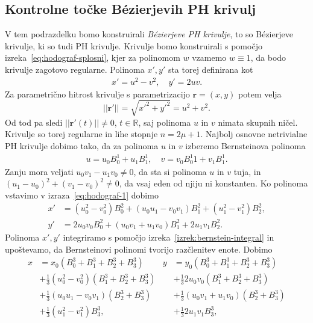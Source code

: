 \documentclass[isrm2, tisk]{fmfdelo}
\newcommand{\R}{\mathbb R}
\begin{document}
    \subsection{Kontrolne točke Bézierjevih PH krivulj}
    V tem podrazdelku bomo konstruirali \textit{Bézierjeve PH krivulje}, to so Bézierjeve krivulje, ki so tudi PH krivulje.
    Krivulje bomo konstruirali s pomočjo izreka~\eqref{eq:hodograf-splosni}, kjer za polinomom $w$ vzamemo $w\equiv 1$, da bodo krivulje zagotovo regularne.
    Polinoma $x',y'$ sta torej definirana kot
    \begin{align}
        x'=u^2-v^2,\quad y'=2uv.  \label{eq:hodograf-1}
    \end{align}
    Za parametrično hitrost krivulje s parametrizacijo $\mathbf{r}=(x,y)$ potem velja
    \[||\mathbf{r'}|| =\sqrt{ x'^2 + y'^2} = u^2+v^2.\]
    Od tod pa sledi $||\mathbf{r'}(t)||\neq 0$, $t\in \R$, saj polinoma $u$ in $v$ nimata skupnih ničel.
    Krivulje so torej regularne in lihe stopnje $n=2\mu+1$.
    Najbolj osnovne netrivialne PH krivulje dobimo tako, da za polinoma $u$ in $v$ izberemo Bernsteinova polinoma
    \begin{align}
        \label{eq:ph-bernstein-1}
        u=u_0B_{0}^{1}+u_1B_{1}^{1}, \quad v=v_0B^1_{0}{1}+v_1B_{1}^{1}.
    \end{align}
    Zanju mora veljati $u_0v_1-u_1v_0\neq 0$, da sta si polinoma $u$ in $v$ tuja, in $(u_1-u_0)^2+(v_1-v_0)^2\neq 0$, da vsaj eden od njiju ni konstanten.
    Ko polinoma vstavimo v izraza~\eqref{eq:hodograf-1} dobimo
    \begin{align*}
        x' &=(u_0^2-v_0^2)B_{0}^{2}+(u_0u_1-v_0v_1)B_{1}^{2} + (u_1^2-v_1^2)B_{2}^{2},\\
        y' &= 2u_0 v_0 B_{0}^{2}+(u_0v_1+u_1v_0)B_{1}^{2}+2u_1 v_1 B_{2}^{2}.
    \end{align*}
    Polinoma $x',y'$ integriramo s pomočjo izreka~\ref{izrek:bernstein-integral} in upoštevamo, da Bernsteinovi polinomi tvorijo razčlenitev enote.
    Dobimo
    \begin{align*}
        x &= x_0(B_{0}^{3} + B_{1}^{3} + B_{2}^{3}+ B_{3}^{3}) & y &= y_0(B_{0}^{3} + B_{1}^{3} + B_{2}^{3}+ B_{3}^{3}) \\
        &+ \frac{1}{3}(u_0^2-v_0^2)(B_{1}^{3} + B_{2}^{3}+ B_{3}^{3})    &     &+ \frac{1}{3}2u_0 v_0(B_{1}^{3} + B_{2}^{3}+ B_{3}^{3}) \\
        &+ \frac{1}{3}(u_0u_1-v_0v_1)(B_{2}^{3}+ B_{3}^{3})          &     &+ \frac{1}{3}(u_0v_1+u_1v_0)(B_{2}^{3}+ B_{3}^{3})\\
        &+ \frac{1}{3} (u_1^2-v_1^2)B_{3}^{3},                        &     &+ \frac{1}{3} 2u_1 v_1 B_{3}^{3},
    \end{align*}
\end{document}
